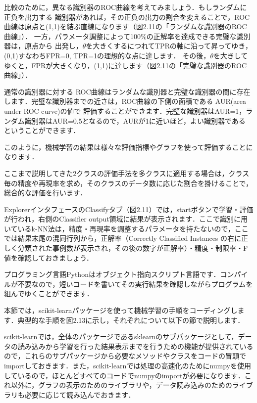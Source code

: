 比較のために，異なる識別器のROC曲線を考えてみましょう．もしランダムに正負を出力する
識別器があれば，その正負の出力の割合を変えることで，ROC曲線は原点と(1,1)を結ぶ直線になります（図2.11の「ランダムな識別器のROC曲線」）．
一方，パラメータ調整によって100\%の正解率を達成できる完璧な識別器は，原点から
出発し，$\theta$を大きくするにつれてTPRの軸に沿って昇ってゆき，(0,1)すなわちFPR=0, TPR=1の理想的な点に達します．
その後，$\theta$を大きしてゆくと，FPRが大きくなり，(1,1)に達します（図2.11の「完璧な識別器のROC曲線」）．

通常の識別器に対する
ROC曲線はランダムな識別器と完璧な識別器の間に存在します．完璧な識別器までの近さは，ROC曲線の下側の面積である
AUR(area under ROC curve)の値で
評価することができます．完璧な識別器はAUR=1，ランダム識別器はAUR=0.5となるので，AURが1に近いほど，よい識別器である
ということができます．


このように，機械学習の結果は様々な評価指標やグラフを使って評価することになります．

ここまで説明してきた2クラスの評価手法を多クラスに適用する場合は，クラス毎の精度や再現率を求め，そのクラスのデータ数に応じた割合を掛けることで，総合的な評価を行います．


ExplorerインタフェースのClassifyタブ（図2.11）では，startボタンで学習・評価が行われ，右側のClassifier output領域に結果が表示されます．ここで識別に用いているk-NN法は，精度・再現率を調整するパラメータを持たないので，ここでは結果末尾の混同行列から，正解率（Correctly Classified Instances の右に正しく分類された事例数が表示され，その後の数字が正解率）・精度・制限率・F値を確認しておきましょう．


プログラミング言語Pythonはオブジェクト指向スクリプト言語です．コンパイルが不要なので，短いコードを書いてその実行結果を確認しながらプログラムを組んでゆくことができます．


本節では，scikit-learnパッケージを使って機械学習の手順をコーディングします．典型的な手順を図2.13に示し，それぞれについて以下の節で説明します．


scikit-learnでは，全体のパッケージであるsklearnのサブパッケージとして，データの読み込みから学習を行った結果表示までを行うための機能が提供されているので，これらのサブパッケージから必要なメソッドやクラスをコードの冒頭でimportしておきます．また，scikit-learnでは処理の高速化のためにnumpyを使用しているので，ほとんどすべてのコードでnumpyのimportが必要になります．これ以外に，グラフの表示のためのライブラリや，データ読み込みのためのライブラリも必要に応じて読み込んでおきます．

